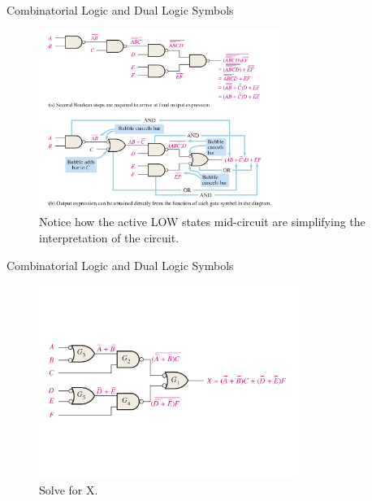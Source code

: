 \documentclass{beamer}
\begin{document}
\begin{frame}{Combinatorial Logic and Dual Logic Symbols}
\begin{figure}
\centering
\includegraphics[width=0.7\textwidth]{figures/ch5_3.pdf}
\caption{\label{fig:ch5_3} Notice how the active LOW states mid-circuit are simplifying the interpretation of the circuit.}
\end{figure}
\end{frame}

\begin{frame}{Combinatorial Logic and Dual Logic Symbols}
\begin{figure}
\centering
\includegraphics[width=0.75\textwidth,trim=0cm 4cm 8.5cm 4cm,clip=true]{figures/ch5_4.pdf}
\caption{\label{fig:ch5_4} Solve for X.}
\end{figure}
\end{frame}
\end{document}
